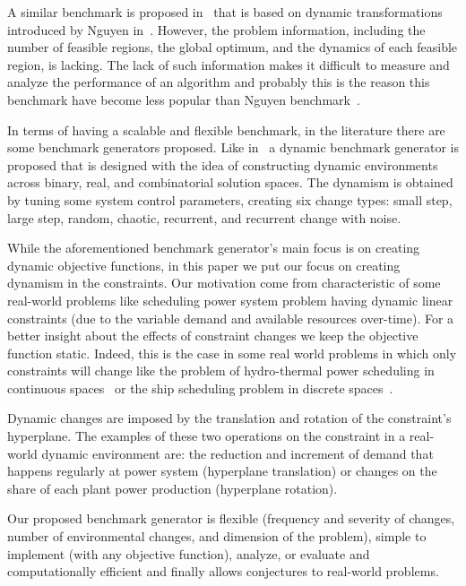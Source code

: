 \documentclass[conference]{IEEEtran}
\begin{document}
A similar benchmark is proposed in~\cite{zhang2014danger} that is based on dynamic transformations introduced by Nguyen in~\cite{Nguyen20121}. However, the problem information, including the number of feasible regions, the global optimum, and the dynamics of each feasible region, is lacking. The lack of such information makes it difficult to measure and analyze the performance of an algorithm and probably this is the reason this benchmark have become less popular than Nguyen benchmark~\cite{Nguyen20121}.

In terms of having a scalable and flexible benchmark, in the literature there are some benchmark generators proposed. Like in~\cite{li2008benchmark} a dynamic benchmark generator is proposed that is designed with the idea of constructing dynamic environments across binary, real, and combinatorial solution spaces. The dynamism is obtained by tuning some system control parameters, creating six change types: small step, large step, random, chaotic, recurrent, and recurrent change with noise. 
 
While the aforementioned benchmark generator's main focus is on creating dynamic objective functions, in this paper we put our focus on creating dynamism in the constraints. Our motivation come from characteristic of some real-world problems like scheduling power system problem having dynamic linear constraints (due to the variable demand and available resources over-time). For a better insight about the effects of constraint changes we keep the objective function static. Indeed, this is the case in some real world problems in which only constraints will change like the problem of hydro-thermal power scheduling in continuous spaces~\cite{deb2007dynamic} or the ship scheduling problem in discrete spaces~\cite{mertens2006dyncoaa}.

Dynamic changes are imposed by the translation and rotation of the constraint's hyperplane.
The examples of these two operations on the constraint in a real-world dynamic environment are: the reduction and increment of demand that happens regularly at power system (hyperplane translation) or changes on the share of each plant power production (hyperplane rotation).

Our proposed benchmark generator is flexible (frequency and severity of changes, number of environmental changes, and dimension of the problem), simple to implement (with any objective function), analyze, or evaluate and computationally efficient and finally allows conjectures to real-world problems.
 
\end{document}
